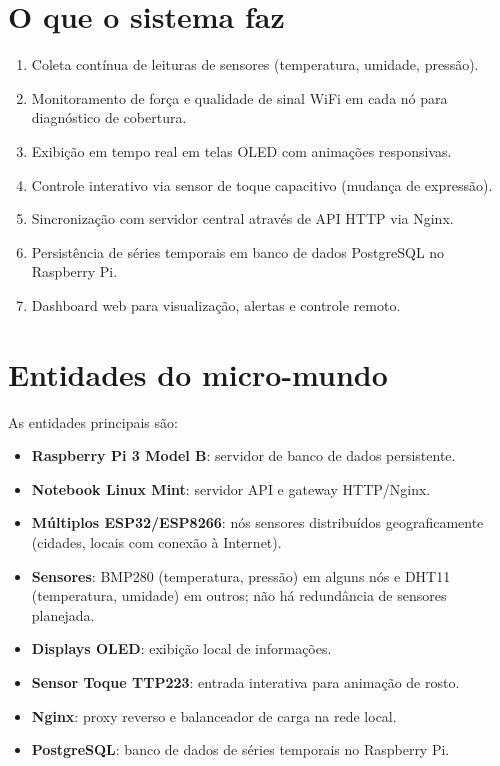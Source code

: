 \documentclass[12pt,a4paper,oneside]{report}
\begin{document}
\section{O que o sistema faz}
\begin{enumerate}[leftmargin=1.2cm]
    \item Coleta contínua de leituras de sensores (temperatura, umidade, pressão).
    \item Monitoramento de força e qualidade de sinal WiFi em cada nó para diagnóstico de cobertura.
    \item Exibição em tempo real em telas OLED com animações responsivas.
    \item Controle interativo via sensor de toque capacitivo (mudança de expressão).
    \item Sincronização com servidor central através de API HTTP via Nginx.
    \item Persistência de séries temporais em banco de dados PostgreSQL no Raspberry Pi.
    \item Dashboard web para visualização, alertas e controle remoto.
\end{enumerate}

\section{Entidades do micro-mundo}
As entidades principais são:
\begin{itemize}[leftmargin=1.2cm]
    \item \textbf{Raspberry Pi 3 Model B}: servidor de banco de dados persistente.
    \item \textbf{Notebook Linux Mint}: servidor API e gateway HTTP/Nginx.
    \item \textbf{Múltiplos ESP32/ESP8266}: nós sensores distribuídos geograficamente (cidades, locais com conexão à Internet).
    \item \textbf{Sensores}: BMP280 (temperatura, pressão) em alguns nós e DHT11 (temperatura, umidade) em outros; não há redundância de sensores planejada.
    \item \textbf{Displays OLED}: exibição local de informações.
    \item \textbf{Sensor Toque TTP223}: entrada interativa para animação de rosto.
    \item \textbf{Nginx}: proxy reverso e balanceador de carga na rede local.
    \item \textbf{PostgreSQL}: banco de dados de séries temporais no Raspberry Pi.
\end{itemize}
\end{document}
